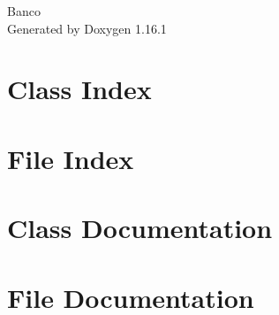 \documentclass[twoside]{book}
\newcommand{\+}{\discretionary{\mbox{\scriptsize$\hookleftarrow$}}{}{}}
\newcommand{\clearemptydoublepage}{%
    \newpage{\pagestyle{empty}\cleardoublepage}%
  }
\begin{document}
  \raggedbottom
    \hypersetup{pageanchor=false,
                bookmarksnumbered=true,
                pdfencoding=unicode
               }
  \begin{titlepage}
  \vspace*{7cm}
  \begin{center}%
  {\Large Banco}\\
  \vspace*{1cm}
  {\large Generated by Doxygen 1.16.1}\\
  \end{center}
  \end{titlepage}
  \clearemptydoublepage
  \tableofcontents
  \clearemptydoublepage
  \hypersetup{pageanchor=true}
\chapter{Class Index}

\chapter{File Index}

\chapter{Class Documentation}

\chapter{File Documentation}

  \backmatter
  \newpage
  \clearemptydoublepage
  \printindex
\end{document}
